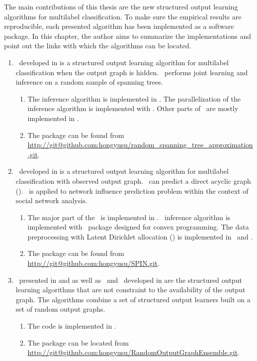 {The main contributions of this thesis are the new structured output learning algorithms for multilabel classification.
To make sure the empirical results are reproducible, each presented algorithm has been implemented as a software package.
In this chapter, the author aims to summarize the implementations and point out the links with which the algorithms can be located.

\begin{enumerate}
	\item \rta\ developed in  is a structured output learning algorithm for multilabel classification when the output graph is hidden. \rta\ performs joint learning and inference on a random sample of spanning trees.
	\begin{enumerate}
		\item The inference algorithm is implemented in \cpp. The parallelization of the inference algorithm is implemented with \openmp. Other parts of \rta\ are mostly implemented in \matlab.
		\item The package can be found from \url{http://git@github.com:hongyusu/random_spanning_tree_approximation.git}.
	\end{enumerate}
	
	\item \spin\ developed in  is a structured output learning algorithm for multilabel classification with observed output graph. \spin\ can predict a direct acyclic graph (\daggraph). \spin\ is applied to network influence prediction problem within the context of social network analysis.
	\begin{enumerate}
		\item The major part of the \spin\ is implemented in \matlab. \sdp\ inference algorithm is implemented with \cvx\ package designed for convex programming. The data preprocessing with Latent Dirichlet allocation (\lda) \citep{Blei03latent} is implemented in \python\ and \matlab.
		\item The package can be found from \url{http://git@github.com:hongyusu/SPIN.git}.
	\end{enumerate}
	
	\item \mve\ presented in  and  as well as \amm\ and \mam\ developed in  are the structured output learning algorithms that are not constraint to the availability of the output graph. The algorithms combine a set of structured output learners built on a set of random output graphs.
	\begin{enumerate}
		\item The code is implemented in \matlab.
		\item The package can be located from \url{http://git@github.com:hongyusu/RandomOutputGraphEnsemble.git}.
	\end{enumerate}
	

\end{enumerate}}

